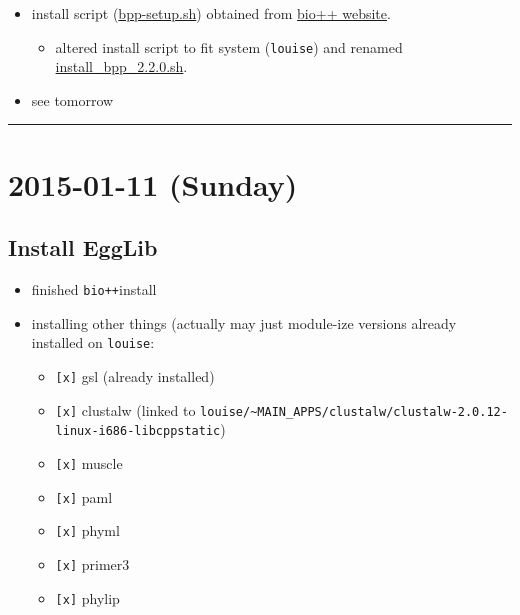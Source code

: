 \documentclass[letterpaper]{scrartcl}
\begin{document}
\begin{itemize}
\itemsep1pt\parskip0pt
\item
  install script
  (\href{http://biopp.univ-montp2.fr/Download/bpp-setup.sh}{bpp-setup.sh})
  obtained from
  \href{http://biopp.univ-montp2.fr/wiki/index.php/Installation}{bio++
  website}.

  \begin{itemize}
  \itemsep1pt\parskip0pt
  \item
    altered install script to fit system (\texttt{louise}) and renamed
    \href{/home/gus/remote_mounts/louise/scripts/installs/install_bpp_2.2.0.sh}{install\_bpp\_2.2.0.sh}.
  \end{itemize}
\item
  see tomorrow
\end{itemize}

\begin{center}\rule{0.5\linewidth}{\linethickness}\end{center}

\section{2015-01-11 (Sunday)}\label{sunday}

\subsection{Install EggLib}\label{install-egglib-1}

\begin{itemize}
\itemsep1pt\parskip0pt
\item
  finished \texttt{bio++}install
\item
  installing other things (actually may just module-ize versions already
  installed on \texttt{louise}:

  \begin{itemize}
  \itemsep1pt\parskip0pt
  \item
    \texttt{{[}x{]}} gsl (already installed)
  \item
    \texttt{{[}x{]}} clustalw (linked to
    \texttt{louise/\textasciitilde{}MAIN\_APPS/clustalw/clustalw-2.0.12-linux-i686-libcppstatic})
  \item
    \texttt{{[}x{]}} muscle
  \item
    \texttt{{[}x{]}} paml
  \item
    \texttt{{[}x{]}} phyml
  \item
    \texttt{{[}x{]}} primer3
  \item
    \texttt{{[}x{]}} phylip
  \end{itemize}
\end{itemize}
\end{document}
